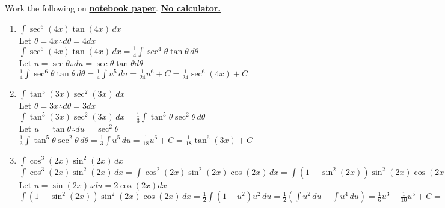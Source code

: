\documentclass[10pt, letterpaper]{report}
\begin{document}
\pagebreak
Work the following on \textbf{\underline{notebook paper}}. \textbf{\underline{No calculator.}}
\begin{enumerate}
  \item{$\int{\sec^{6}{(4x)}\tan{(4x)}}\,dx$} \\
  
    Let $\theta=4x\therefore d\theta=4dx$ \\
    
    $\int{\sec^{6}{(4x)}\tan{(4x)}}\,dx=
    \frac{1}{4}\int{\sec^{4}{\theta}\tan{\theta}}\,d\theta$ \\
    
    Let $u=\sec{\theta}\therefore du=\sec{\theta}\tan{\theta}d\theta$ \\
    
    $\frac{1}{4}\int{\sec^{6}{\theta}\tan{\theta}}\,d\theta=
    \frac{1}{4}\int{u^{5}}\,du=
    \frac{1}{24}u^{6}+C=
    \frac{1}{24}\sec^{6}{(4x)}+C$ \\
    
  \item{$\int{\tan^{5}{(3x)}\sec^{2}{(3x)}}\,dx$} \\
  
    Let $\theta=3x\therefore d\theta=3dx$ \\
    
    $\int{\tan^{5}{(3x)}\sec^{2}{(3x)}}\,dx=
    \frac{1}{3}\int{\tan^{5}{\theta}\sec^{2}{\theta}}\,d\theta$ \\
    
    Let $u=\tan{\theta}\therefore du=\sec^{2}{\theta}$ \\
    
    $\frac{1}{3}\int{\tan^{5}{\theta}\sec^{2}{\theta}}\,d\theta=
    \frac{1}{3}\int{u^{5}}\,du=
    \frac{1}{18}u^{6}+C=
    \frac{1}{18}\tan^{6}{(3x)}+C$ \\
    
  \item{$\int{\cos^{3}{(2x)}\sin^{2}{(2x)}}\,dx$} \\
  
    $\int{\cos^{3}{(2x)}\sin^{2}{(2x)}}\,dx=
    \int{\cos^{2}{(2x)}\sin^{2}{(2x)}\cos{(2x)}}\,dx=
    \int{(1-\sin^{2}{(2x)})\sin^{2}{(2x)}\cos{(2x)}}\,dx$ \\
    
    Let $u=\sin{(2x)}\therefore du=2\cos{(2x)}dx$ \\
    
    $\int{(1-\sin^{2}{(2x)})\sin^{2}{(2x)}\cos{(2x)}}\,dx=
    \frac{1}{2}\int{(1-u^{2})u^{2}}\,du=
    \frac{1}{2}\left(\int{u^{2}}\,du-\int{u^{4}}\,du\right)=
    \frac{1}{6}u^{3}-\frac{1}{10}u^{5}+C=$ \\
    

\end{enumerate}
\end{document}
